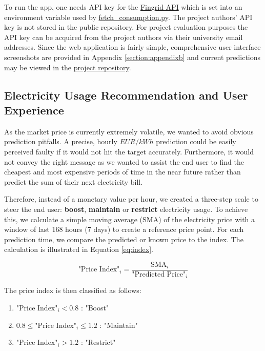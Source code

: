 \documentclass{article}
\begin{document}
To run the app, one needs API key for the \href{https://data.fingrid.fi/open-data-forms/registration/}{Fingrid API} which is set into an environment variable used by \href{https://github.com/IDS-mini/electricity/blob/main/src/app/utils/fetch_consumption.py}{fetch\_consumption.py}. The project authors' API key is not stored in the public repository. For project evaluation purposes the API key can be acquired from the project authors via their university email addresses. Since the web application is fairly simple, comprehensive user interface screenshots are provided in Appendix \ref{section:appendixb} and current predictions may be viewed in the \href{https://github.com/IDS-mini/electricity/blob/main/forecast_data/forecasts.csv}{project repository}.

\subsection{Electricity Usage Recommendation and User Experience}
\label{subsection:ux}

As the market price is currently extremely volatile, we wanted to avoid obvious prediction pitfalls. A precise, hourly $EUR/kWh$ prediction could be easily perceived faulty if it would not hit the target accurately. Furthermore, it would not convey the right message as we wanted to assist the end user to find the cheapest and most expensive periods of time in the near future rather than predict the sum of their next electricity bill.

Therefore, instead of a monetary value per hour, we created a three-step scale to steer the end user: \textbf{boost}, \textbf{maintain} or \textbf{restrict} electricity usage. To achieve this, we calculate a simple moving average (SMA) of the electricity price with a window of last 168 hours (7 days) to create a reference price point. For each prediction time, we compare the predicted or known price to the index. The calculation is illustrated in Equation \ref{eq:index}.


\begin{equation} \label{eq:index}
\text{"Price Index"}_i = \frac{\text{SMA}_i}{\text{"Predicted Price"}_i}
\end{equation}

The price index is then classified as follows:

\begin{enumerate}
    \item $\text{"Price Index"}_i < 0.8$ : "Boost"
    \item $0.8 \leq \text{"Price Index"}_i \leq 1.2$ : "Maintain"
    \item $\text{"Price Index"}_i > 1.2$ : "Restrict"
\end{enumerate}
\end{document}
